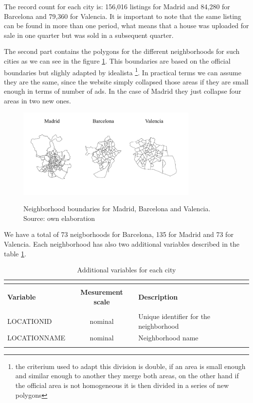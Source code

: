 \documentclass[times,final]{elsarticle}
\begin{document}
The record count for each city is: 156,016 listings for Madrid and 84,280 for Barcelona and 79,360 for Valencia. It is important to note that the same listing can be found in more than one period, what means that a house was uploaded for sale in one quarter but was sold in a subsequent quarter.

The second part contains the polygons for the different neighborhoods for such cities as we can see in the figure \ref{fig:all-polygons}. This boundaries are based on the official boundaries but slighly adapted by idealista \footnote{the criterium used to adapt this division is double, if an area is small enough and similar enough to another they merge both areas, on the other hand if the official area is not homogeneous it is then divided in a series of new polygons}. In practical terms we can assume they are the same, since the website simply collapsed those areas if they are small enough in terms of number of ads. In the case of Madrid they just collapse four areas in two new ones.

\begin{figure}[h]
  \caption{Neighborhood boundaries for Madrid, Barcelona and Valencia. Source: own elaboration}
  \centering
  \includegraphics[height=4.5cm]{figures/idealista18-all-polygons}
  \label{fig:all-polygons}
\end{figure}

We have a total of 73 neigborhoods for Barcelona, 135 for Madrid and 73 for Valencia. Each neighborhood has also two additional variables described in the table \ref{table:data-additional-variables}.

\begin{footnotesize}
\begin{longtable}{p{40mm} c p{63mm}}
\caption{Additional variables for each city} \\
\label{table:data-additional-variables} \\
\hline
\hline
& &\\
\textbf{Variable} & \textbf{Mesurement scale} & \textbf{Description}\\
\hline
& &\\
LOCATIONID & nominal & Unique identifier for the neighborhood \\
LOCATIONNAME & nominal & Neighborhood name \\
& &\\
\hline
\end{longtable}
\end{footnotesize}
\end{document}
